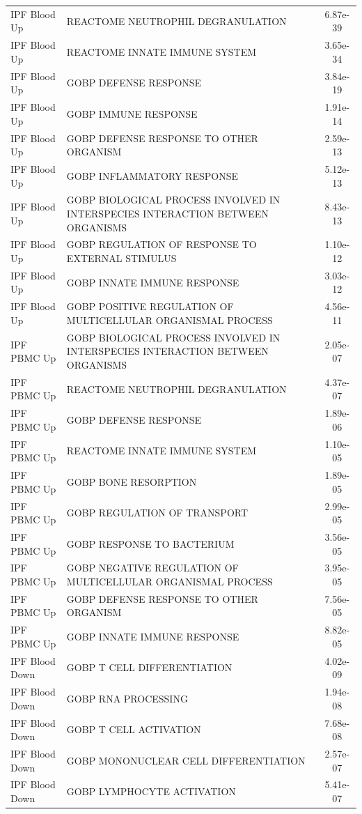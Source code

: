 \documentclass[
]{article}
\begin{document}
\begin{singlespace}
\begin{longtable}[t]{>{\raggedright\arraybackslash}p{1.0in}>{\raggedright\arraybackslash}p{4.5in}c}
\endfoot
\bottomrule
\endlastfoot
IPF Blood Up & REACTOME NEUTROPHIL DEGRANULATION & 6.87e-39\\
IPF Blood Up & REACTOME INNATE IMMUNE SYSTEM & 3.65e-34\\
IPF Blood Up & GOBP DEFENSE RESPONSE & 3.84e-19\\
IPF Blood Up & GOBP IMMUNE RESPONSE & 1.91e-14\\
IPF Blood Up & GOBP DEFENSE RESPONSE TO OTHER ORGANISM & 2.59e-13\\
\addlinespace
IPF Blood Up & GOBP INFLAMMATORY RESPONSE & 5.12e-13\\
IPF Blood Up & GOBP BIOLOGICAL PROCESS INVOLVED IN INTERSPECIES INTERACTION BETWEEN ORGANISMS & 8.43e-13\\
IPF Blood Up & GOBP REGULATION OF RESPONSE TO EXTERNAL STIMULUS & 1.10e-12\\
IPF Blood Up & GOBP INNATE IMMUNE RESPONSE & 3.03e-12\\
IPF Blood Up & GOBP POSITIVE REGULATION OF MULTICELLULAR ORGANISMAL PROCESS & 4.56e-11\\
\addlinespace
IPF PBMC Up & GOBP BIOLOGICAL PROCESS INVOLVED IN INTERSPECIES INTERACTION BETWEEN ORGANISMS & 2.05e-07\\
IPF PBMC Up & REACTOME NEUTROPHIL DEGRANULATION & 4.37e-07\\
IPF PBMC Up & GOBP DEFENSE RESPONSE & 1.89e-06\\
IPF PBMC Up & REACTOME INNATE IMMUNE SYSTEM & 1.10e-05\\
IPF PBMC Up & GOBP BONE RESORPTION & 1.89e-05\\
\addlinespace
IPF PBMC Up & GOBP REGULATION OF TRANSPORT & 2.99e-05\\
IPF PBMC Up & GOBP RESPONSE TO BACTERIUM & 3.56e-05\\
IPF PBMC Up & GOBP NEGATIVE REGULATION OF MULTICELLULAR ORGANISMAL PROCESS & 3.95e-05\\
IPF PBMC Up & GOBP DEFENSE RESPONSE TO OTHER ORGANISM & 7.56e-05\\
IPF PBMC Up & GOBP INNATE IMMUNE RESPONSE & 8.82e-05\\
\addlinespace
IPF Blood Down & GOBP T CELL DIFFERENTIATION & 4.02e-09\\
IPF Blood Down & GOBP RNA PROCESSING & 1.94e-08\\
IPF Blood Down & GOBP T CELL ACTIVATION & 7.68e-08\\
IPF Blood Down & GOBP MONONUCLEAR CELL DIFFERENTIATION & 2.57e-07\\
IPF Blood Down & GOBP LYMPHOCYTE ACTIVATION & 5.41e-07\\

\end{longtable}
\end{singlespace}
\end{document}
